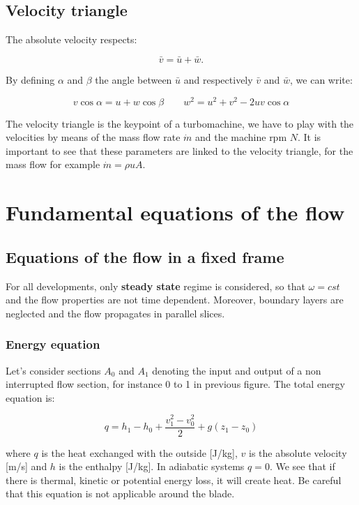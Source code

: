 \subsection{Velocity triangle}
The absolute velocity respects: 

\begin{equation}
\bar{v} = \bar{u} + \bar{w}.
\end{equation}

By defining $\alpha$ and $\beta$ the angle between $\bar{u}$ and respectively $\bar{v}$ and $\bar{w}$, we can write: 

\begin{equation}
v \cos \alpha = u + w\cos \beta \qquad w^2 = u^2 + v^2 - 2uv\cos \alpha
\end{equation}

The velocity triangle is the keypoint of a turbomachine, we have to play with the velocities by means of the mass flow rate $\dot{m}$ and the machine rpm $N$. It is important to see that these parameters are linked to the velocity triangle, for the mass flow for example $\dot{m} = \rho u A$. 


\section{Fundamental equations of the flow}
\subsection{Equations of the flow in a fixed frame}
For all developments, only \textbf{steady state} regime is considered, so that $\omega = cst$ and the flow properties are not time dependent. Moreover, boundary layers are neglected and the flow propagates in parallel slices. 

\subsubsection{Energy equation}
Let's consider sections $A_0$ and $A_1$ denoting the input and output of a non interrupted flow section, for instance 0 to 1 in previous figure. The total energy equation is: 

\begin{equation}
q = h_1 - h_0 + \frac{v_1^2 - v_0^2}{2} + g(z_1-z_0)
\label{2.1}
\end{equation}

where $q$ is the heat exchanged with the outside [J/kg], $v$ is the absolute velocity [m/s] and $h$ is the enthalpy [J/kg]. In adiabatic systems $q=0$. We see that if there is thermal, kinetic or potential energy loss, it will create heat. Be careful that this equation is not applicable around the blade. 

